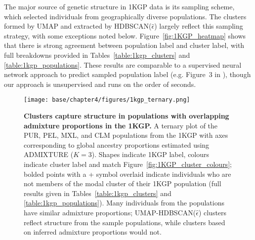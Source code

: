 The major source of genetic structure in 1KGP data is its sampling scheme, which selected individuals from geographically diverse populations. The clusters formed by UMAP and extracted by HDBSCAN($\hat{\epsilon}$) largely reflect this sampling strategy, with some exceptions noted below. Figure~\ref{fig:1KGP_heatmap} shows that there is strong agreement between population label and cluster label, with full breakdowns provided in Tables~\ref{table:1kgp_clusters} and \ref{table:1kgp_populations}. These results are comparable to a supervised neural network approach to predict sampled population label (e.g. Figure~3 in \citep{romero_diet_2017}), though our approach is unsupervised and runs on the order of seconds.

\clearpage

\begin{figure}[ht]
  \centering
    \texttt{[image: base/chapter4/figures/1kgp\_ternary.png]}
  \caption[Clusters capture structure in populations with overlapping admixture proportions in the 1KGP]{\textbf{Clusters capture structure in populations with overlapping admixture proportions in the 1KGP.} A ternary plot of the PUR, PEL, MXL, and CLM populations from the 1KGP with axes corresponding to global ancestry proportions estimated using ADMIXTURE ($K=3$). Shapes indicate 1KGP label, colours indicate cluster label and match Figure~\ref{fig:1KGP_cluster_colours}; bolded points with a + symbol overlaid indicate individuals who are not members of the modal cluster of their 1KGP population (full results given in Tables~\ref{table:1kgp_clusters} and \ref{table:1kgp_populations}). Many individuals from the populations have similar admixture proportions; UMAP-HDBSCAN($\hat{\epsilon}$) clusters reflect structure from the sample populations, while clusters based on inferred admixture proportions would not.}
  \label{fig:1000GP_ternary}
\end{figure}

\clearpage

